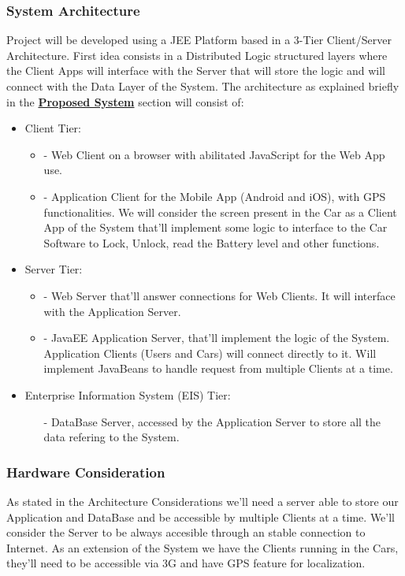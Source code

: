 \documentclass[a4paper]{article}
\begin{document}
\subsubsection{System Architecture}
Project will be developed using a JEE Platform based in a 3-Tier Client/Server Architecture. First idea consists in a Distributed Logic structured layers where the Client Apps will interface with the Server that will store the logic and will connect with the Data Layer of the System. The architecture as explained briefly in the \textbf{\hyperref[sec:propSystem]{Proposed System}} section will consist of:
\begin {itemize}
\item Client Tier: 
\begin {itemize}
\item [-]Web Client on a browser with abilitated JavaScript for the Web App use. 
\item [-]Application Client for the Mobile App (Android and iOS), with GPS functionalities. We will consider the screen present in the Car as a Client App of the System that'll implement some logic to interface to the Car Software to Lock, Unlock, read the Battery level and other functions.
\end{itemize}

\item Server Tier:
\begin {itemize}
\item [-]Web Server that'll answer connections for Web Clients. It will interface with the Application Server.
\item [-]JavaEE Application Server, that'll implement the logic of the System. Application Clients (Users and Cars) will connect directly to it. Will implement JavaBeans to handle request from multiple Clients at a time.
\end{itemize}

\item Enterprise Information System (EIS) Tier:
\begin{itemize}
\item [-]DataBase Server, accessed by the Application Server to store all the data refering to the System.
\end{itemize}

\end{itemize}

\subsubsection{Hardware Consideration}
As stated in the Architecture Considerations we'll need a server able to store our Application and DataBase and be accessible by multiple Clients at a time. We'll consider the Server to be always accesible through an stable connection to Internet. 
As an extension of the System we have the Clients running in the Cars, they'll need to be accessible via 3G and have GPS feature for localization.
\end{document}
